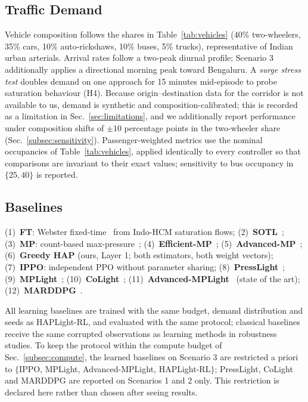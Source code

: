 \documentclass[journal]{IEEEtran}
\begin{document}
\subsection{Traffic Demand}
Vehicle composition follows the shares in Table~\ref{tab:vehicles}
(40\% two-wheelers, 35\% cars, 10\% auto-rickshaws, 10\% buses, 5\%
trucks), representative of Indian urban arterials. Arrival rates follow a
two-peak diurnal profile; Scenario 3 additionally applies a directional
morning peak toward Bengaluru. A \emph{surge stress test} doubles demand
on one approach for 15 minutes mid-episode to probe saturation behaviour
(H4). Because origin--destination data for the corridor is not available
to us, demand is synthetic and composition-calibrated; this is recorded
as a limitation in Sec.~\ref{sec:limitations}, and we additionally report
performance under composition shifts of $\pm10$ percentage points in the
two-wheeler share (Sec.~\ref{subsec:sensitivity}). Passenger-weighted
metrics use the nominal occupancies of Table~\ref{tab:vehicles}, applied
identically to every controller so that comparisons are invariant to
their exact values; sensitivity to bus occupancy in $\{25,40\}$ is
reported.

\subsection{Baselines}
\label{subsec:baselines}
(1)~\textbf{FT}: Webster fixed-time~\cite{b_webster} from Indo-HCM
saturation flows; (2)~\textbf{SOTL}~\cite{b_sotl};
(3)~\textbf{MP}: count-based max-pressure~\cite{b_varaiya};
(4)~\textbf{Efficient-MP}~\cite{b_efficientmp};
(5)~\textbf{Advanced-MP}~\cite{b_advxlight};
(6)~\textbf{Greedy HAP} (ours, Layer 1; both estimators, both weight
vectors); (7)~\textbf{IPPO}: independent PPO without parameter sharing;
(8)~\textbf{PressLight}~\cite{b_presslight};
(9)~\textbf{MPLight}~\cite{b_mplight};
(10)~\textbf{CoLight}~\cite{b_colight};
(11)~\textbf{Advanced-MPLight}~\cite{b_advxlight} (state of the art);
(12)~\textbf{MARDDPG}~\cite{b_marddpg}.

All learning baselines are trained with the same budget, demand
distribution and seeds as HAPLight-RL, and evaluated with the same
protocol; classical baselines receive the same corrupted observations as
learning methods in robustness studies. To keep the protocol within the
compute budget of Sec.~\ref{subsec:compute}, the learned baselines on
Scenario 3 are restricted a priori to
$\{$IPPO, MPLight, Advanced-MPLight, HAPLight-RL$\}$; PressLight,
CoLight and MARDDPG are reported on Scenarios 1 and 2 only. This
restriction is declared here rather than chosen after seeing results.
\end{document}
